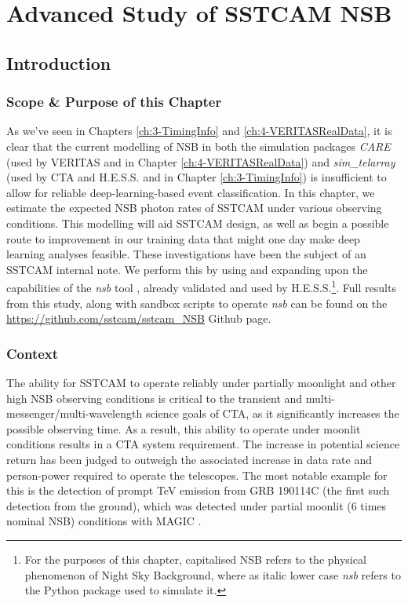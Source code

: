 \chapter{\label{ch:5-CHECNSB} Advanced Study of SSTCAM NSB}
\minitoc
\section{Introduction}
\label{sec:intro}

\subsection{Scope \& Purpose of this Chapter}
\label{sec:intro:scope}
As we've seen in Chapters \ref{ch:3-TimingInfo} and \ref{ch:4-VERITASRealData}, it is clear that the current modelling of NSB in both the simulation packages \textit{CARE} (used by VERITAS and in Chapter \ref{ch:4-VERITASRealData}) and \textit{sim\_telarray} (used by CTA and H.E.S.S. and in Chapter \ref{ch:3-TimingInfo}) is insufficient to allow for reliable deep-learning-based event classification. In this chapter, we estimate the expected NSB photon rates of SSTCAM under various observing conditions. This modelling will aid SSTCAM design, as well as begin a possible route to improvement in our training data that might one day make deep learning analyses feasible. These investigations have been the subject of an SSTCAM internal note. We perform this by using and expanding upon the capabilities of the \textit{nsb} tool \cite{nsb}, already validated and used by H.E.S.S.\footnote{For the purposes of this chapter, capitalised NSB refers to the physical phenomenon of Night Sky Background, where as italic lower case \textit{nsb} refers to the Python package used to simulate it.}. Full results from this study, along with sandbox scripts to operate \textit{nsb} can be found on the \url{https://github.com/sstcam/sstcam_NSB} Github page. 

\subsection{Context}
\label{sec:intro:context}
The ability for SSTCAM to operate reliably under partially moonlight and other high NSB observing conditions is critical to the transient and multi-messenger/multi-wavelength science goals of CTA, as it significantly increases the possible observing time. As a result, this ability to operate under moonlit conditions results in a CTA system requirement. The increase in potential science return has been judged to outweigh the associated increase in data rate and person-power required to operate the telescopes. The most notable example for this is the detection of prompt TeV emission from GRB 190114C (the first such detection from the ground), which was detected under partial moonlit (6 times nominal NSB) conditions with MAGIC \cite{magicGRB}. 

